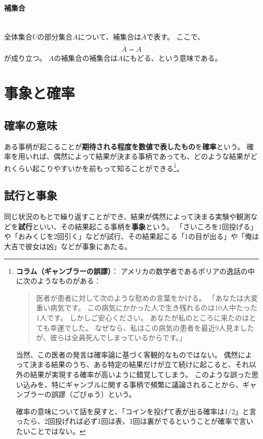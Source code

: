 \documentclass[luatexja,fontsize=12pt]{jlreq}\usepackage{ifthen}\newcounter{enlarge}\setcounter{enlarge}{1}
\begin{document}
\paragraph{補集合}\mbox{}\\
\indent
全体集合$U$の部分集合$A$について、補集合は$\overline{A}$で表す。
ここで、
\begin{align} \label{eq:0_7}
\overline{\overline{A}}=A
\end{align}
が成り立つ。
$A$の補集合の補集合は$A$にもどる、という意味である。

\section{事象と確率}

\subsection{確率の意味}

ある事柄が起こることが\textbf{期待される程度を数値で表したもの}を\textbf{確率}という。
確率を用いれば、偶然によって結果が決まる事柄であっても、どのような結果がどれくらい起こりやすいかを前もって知ることができる\footnote{%
\textbf{コラム（ギャンブラーの誤謬）}：
アメリカの数学者であるポリアの逸話の中に次のようなものがある：
\begin{quotation}
    医者が患者に対して次のような慰めの言葉をかける。
    「あなたは大変重い病気です。
    この病気にかかった人で生き残れるのは10人中たった1人です。
    しかしご安心ください。
    あなたが私のところに来たのはとても幸運でした。
    なぜなら、私はこの病気の患者を最近9人見ましたが、彼らは全員死んでしまっているからです。」
\end{quotation}
当然、この医者の発言は確率論に基づく客観的なものではない。
偶然によって決まる結果のうち、ある特定の結果だけが立て続けに起こると、それ以外の結果が実現する確率が高いように錯覚してしまう。
このような誤った思い込みを、特にギャンブルに関する事柄で頻繁に議論されることから、ギャンブラーの誤謬（ごびゅう）という。

確率の意味について話を戻すと、「コインを投げて表が出る確率は1/2」と言ったら、2回投げれば必ず1回は表、1回は裏がでるということが確率で言いたいことではない。
}。

\subsection{試行と事象}

同じ状況のもとで繰り返すことができ、結果が偶然によって決まる実験や観測などを\textbf{試行}といい、その結果起こる事柄を\textbf{事象}という。
「さいころを1回投げる」や「おみくじを2回引く」などが試行、その結果起こる「1の目が出る」や「俺は大吉で彼女は凶」などが事象にあたる。
\end{document}
